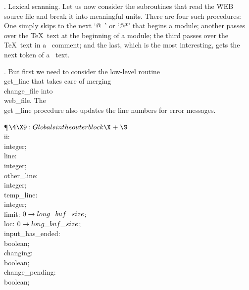 .  Lexical scanning.
Let us now consider the subroutines that read the \.{WEB} source file
and break it into meaningful units. There are four such procedures:
One simply skips to the next `\.{@\ }' or `\.{@*}' that begins a
module; another passes over the \TeX\ text at the beginning of a
module; the third passes over the \TeX\ text in a \PASCAL\ comment;
and the last, which is the most interesting, gets the next token of
a \PASCAL\ text.

\fi

. But first we need to consider the low-level routine \\{get\_line}
that takes care of merging \\{change\_file} into \\{web\_file}. The \\{get%
\_line}
procedure also updates the line numbers for error messages.

\Y\P$\4\X9:Globals in the outer block\X\mathrel{+}\S$\6
\4\\{ii}: \\{integer};\6
\4\\{line}: \\{integer};\6
\4\\{other\_line}: \\{integer};\6
\4\\{temp\_line}: \\{integer};\6
\4\\{limit}: $0\to\\{long\_buf\_size}$;\6
\4\\{loc}: $0\to\\{long\_buf\_size}$;\6
\4\\{input\_has\_ended}: \\{boolean};%
\6
\4\\{changing}: \\{boolean};\6
\4\\{change\_pending}: \\{boolean};\par
\fi

